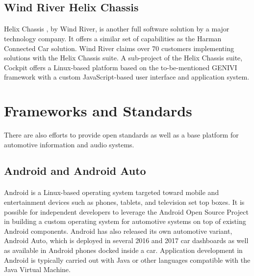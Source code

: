 \subsection{Wind River Helix Chassis}

\paragraph{}
Helix Chassis \cite{helix-chassis}, by Wind River, is another full software solution by a major technology company.
It offers a similar set of capabilities as the Harman Connected Car solution.
Wind River claims over 70 customers implementing solutions with the Helix Chassis suite.
A sub-project of the Helix Chassis suite, Cockpit offers a Linux-based platform based on the to-be-mentioned GENIVI framework with a custom JavaScript-based user interface and application system.

\section{Frameworks and Standards}

\paragraph{}
There are also efforts to provide open standards as well as a base platform for automotive information and audio systems.

\subsection{Android and Android Auto}

\paragraph{}
Android is a Linux-based operating system targeted toward mobile and entertainment devices such as phones, tablets, and television set top boxes.
It is possible for independent developers to leverage the Android Open Source Project in building a custom operating system for automotive systems on top of existing Android components.
Android has also released its own automotive variant, Android Auto, which is deployed in several 2016 and 2017 car dashboards as well as available in Android phones docked inside a car.
Application development in Android is typically carried out with Java or other languages compatible with the Java Virtual Machine.

